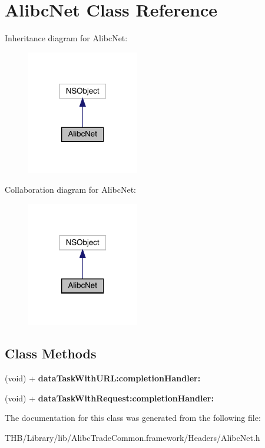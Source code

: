\hypertarget{interface_alibc_net}{}\section{Alibc\+Net Class Reference}
\label{interface_alibc_net}


Inheritance diagram for Alibc\+Net\+:\nopagebreak
\begin{figure}[H]
\begin{center}
\leavevmode
\includegraphics[width=139pt]{interface_alibc_net__inherit__graph}
\end{center}
\end{figure}


Collaboration diagram for Alibc\+Net\+:\nopagebreak
\begin{figure}[H]
\begin{center}
\leavevmode
\includegraphics[width=139pt]{interface_alibc_net__coll__graph}
\end{center}
\end{figure}
\subsection*{Class Methods}
\begin{DoxyCompactItemize}
\item 
\mbox{\label{interface_alibc_net_a5a2c59827b1ca12e30fec33bf1e60a10}} 
(void) + {\bfseries data\+Task\+With\+U\+R\+L\+:completion\+Handler\+:}
\item 
\mbox{\label{interface_alibc_net_a032bba7176e8fc1b5e75845b017a57e9}} 
(void) + {\bfseries data\+Task\+With\+Request\+:completion\+Handler\+:}
\end{DoxyCompactItemize}


The documentation for this class was generated from the following file\+:\begin{DoxyCompactItemize}
\item 
T\+H\+B/\+Library/lib/\+Alibc\+Trade\+Common.\+framework/\+Headers/Alibc\+Net.\+h\end{DoxyCompactItemize}
